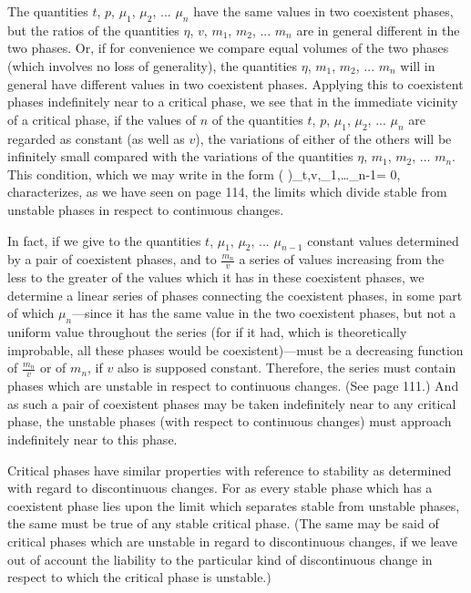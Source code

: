 \documentclass[12pt]{article}
\begin{document}
The quantities $t$, $p$, $\mu_1$, $\mu_2$, ... $\mu_n$ have the same values in two coexistent phases, but the ratios of the quantities $\eta$, $v$, $m_1$, $m_2$, ... $m_n$ are in general different in the two phases. Or, if for convenience we compare equal volumes of the two phases (which involves no loss of generality), the quantities $\eta$, $m_1$, $m_2$, ... $m_n$ will in general have different values in two coexistent phases. Applying this to coexistent phases indefinitely near to a critical phase, we see that in the immediate vicinity of a critical phase, if the values of $n$ of the quantities $t$, $p$, $\mu_1$, $\mu_2$, ... $\mu_n$ are regarded as constant (as well as $v$), the variations of either of the others will be infinitely small compared with the variations of the quantities $\eta$, $m_1$, $m_2$, ... $m_n$. This condition, which we may write in the form
\eqs \left( \right)_{t,v,\mu_1,\dots \mu_{n-1}}= 0,\label{200}
\eqe
characterizes, as we have seen on page 114, the limits which divide stable from unstable phases in respect to continuous changes.


In fact, if we give to the quantities $t$, $\mu_1$, $\mu_2$, ... $\mu_{n-1}$ constant values determined by a pair of coexistent phases, and to $\frac{m_n}{v}$ a series of values increasing from the less to the greater of the values which it has in these coexistent phases, we determine a linear series of phases connecting the coexistent phases, in some part of which $\mu_n$---since it has the same value in the two coexistent phases, but not a uniform value throughout the series (for if it had, which is theoretically improbable, all these phases would be coexistent)---must be a decreasing
function of $\frac{m_n}{v}$ or of $m_n$, if $v$ also is supposed constant. Therefore, the series must contain phases which are unstable in respect to continuous changes. (See page 111.) And as such a pair of coexistent phases may be taken indefinitely near to any critical phase, the unstable phases (with respect to continuous changes) must approach indefinitely near to this phase.


Critical phases have similar properties with reference to stability as determined with regard to discontinuous changes. For as every stable phase which has a coexistent phase lies upon the limit which separates stable from unstable phases, the same must be true of any stable critical phase. (The same may be said of critical phases which are unstable in regard to discontinuous changes, if we leave out of account the liability to the particular kind of discontinuous change in respect to which the critical phase is unstable.)
\end{document}
